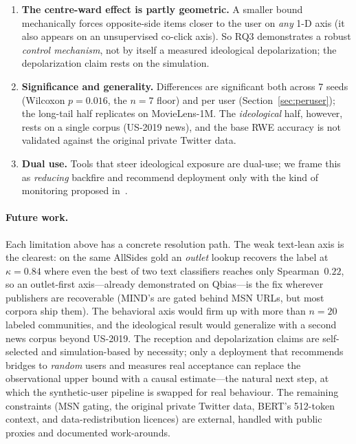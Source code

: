 \documentclass[sigconf,nonacm]{acmart}
\begin{document}
\begin{enumerate}
  never sees the labels), and it rests on $n{=}20$ labels. \textbf{So the flagship MIND
  RQ3 (text-lean axis) is \emph{suggestive}}, but the bounded-bridging \emph{mechanism}
  (Limitation~2, robust on any 1-D axis) is independently demonstrated on the
  \emph{validated} Politosphere axis, where RWE-B again bridges hardest
  ($\mathrm{uw\_shift}\ 1.97\pm0.04$, $5/5$ seeds).
  \item \textbf{The centre-ward effect is partly geometric.} A smaller bound
  mechanically forces opposite-side items closer to the user on \emph{any} 1-D
  axis (it also appears on an unsupervised co-click axis). So RQ3 demonstrates a
  robust \emph{control mechanism}, not by itself a measured ideological
  depolarization; the depolarization claim rests on the simulation.
  \item \textbf{Significance and generality.} Differences are significant both
  across 7 seeds (Wilcoxon $p=0.016$, the $n{=}7$ floor) and per user
  (Section~\ref{sec:peruser}); the long-tail half replicates on MovieLens-1M. The
  \emph{ideological} half, however, rests on a single corpus (US-2019 news), and
  the base RWE accuracy is not validated against the original private Twitter
  data.
  \item \textbf{Dual use.} Tools that steer ideological exposure are dual-use; we
  frame this as \emph{reducing} backfire and recommend deployment only with the
  kind of monitoring proposed in~\cite{stray2021designing}.
\end{enumerate}

\paragraph{Future work.} Each limitation above has a concrete resolution path. The weak
text-lean axis is the clearest: on the same AllSides gold an \emph{outlet} lookup recovers the
label at $\kappa{=}0.84$ where even the best of two text classifiers reaches only Spearman~$0.22$, so an outlet-first
axis---already demonstrated on Qbias---is the fix wherever publishers are recoverable (MIND's
are gated behind MSN URLs, but most corpora ship them). The behavioral axis would firm up with
more than $n{=}20$ labeled communities, and the ideological result would generalize with a
second news corpus beyond US-2019. The reception and depolarization claims are self-selected and
simulation-based by necessity; only a deployment that recommends bridges to \emph{random} users
and measures real acceptance can replace the observational upper bound with a causal
estimate---the natural next step, at which the synthetic-user pipeline is swapped for real
behaviour. The remaining constraints (MSN gating, the original private Twitter data, BERT's
512-token context, and data-redistribution licences) are external, handled with public proxies
and documented work-arounds.
\end{document}
